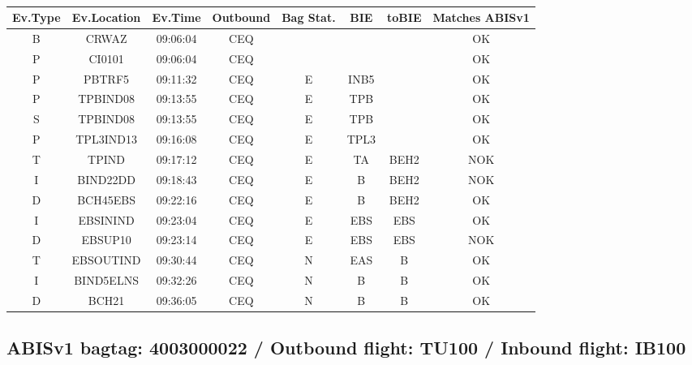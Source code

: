 \documentclass{report}
\begin{document}
\paragraph{}
\begin{longtable}{cccccccc}    \toprule
\rowcolor{white!50}
\textbf{Ev.Type} & \textbf{Ev.Location} & \textbf{Ev.Time} & \textbf{Outbound} & \textbf{Bag Stat.} & \textbf{BIE} & \textbf{toBIE} & \textbf{Matches ABISv1} \\\midrule
B & CRWAZ & 09:06:04  & CEQ &  &  &  & OK\\
P & CI0101 & 09:06:04  & CEQ &  &  &  & OK\\
P & PBTRF5 & 09:11:32  & CEQ & E & INB5 &  & OK\\
P & TPBIND08 & 09:13:55  & CEQ & E & TPB &  & OK\\
S & TPBIND08 & 09:13:55  & CEQ & E & TPB &  & OK\\
P & TPL3IND13 & 09:16:08  & CEQ & E & TPL3 &  & OK\\
T & TPIND & 09:17:12  & CEQ & E & TA & BEH2 & NOK\\
I & BIND22DD & 09:18:43  & CEQ & E & B & BEH2 & NOK\\
D & BCH45EBS & 09:22:16  & CEQ & E & B & BEH2 & OK\\
I & EBSININD & 09:23:04  & CEQ & E & EBS & EBS & OK\\
D & EBSUP10 & 09:23:14  & CEQ & E & EBS & EBS & NOK\\
T & EBSOUTIND & 09:30:44  & CEQ & N & EAS & B & OK\\
I & BIND5ELNS & 09:32:26  & CEQ & N & B & B & OK\\
D & BCH21 & 09:36:05  & CEQ & N & B & B & OK\\
\bottomrule
\end{longtable}
\subsection*{ABISv1 bagtag: 4003000022 / Outbound flight: TU100 / Inbound flight: IB100}
\end{document}
